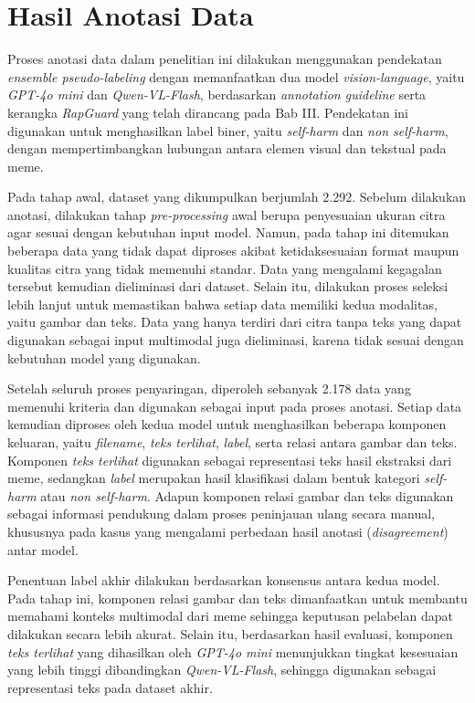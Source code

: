 \section{Hasil Anotasi Data} \label{IV.Anotasi}

Proses anotasi data dalam penelitian ini dilakukan menggunakan pendekatan \textit{ensemble pseudo-labeling} dengan memanfaatkan dua model \textit{vision-language}, yaitu \textit{GPT-4o mini} dan \textit{Qwen-VL-Flash}, berdasarkan \textit{annotation guideline} serta kerangka \textit{RapGuard} yang telah dirancang pada Bab III. Pendekatan ini digunakan untuk menghasilkan label biner, yaitu \textit{self-harm} dan \textit{non self-harm}, dengan mempertimbangkan hubungan antara elemen visual dan tekstual pada meme.

Pada tahap awal, dataset yang dikumpulkan berjumlah 2.292. Sebelum dilakukan anotasi, dilakukan tahap \textit{pre-processing} awal berupa penyesuaian ukuran citra  agar sesuai dengan kebutuhan input model. Namun, pada tahap ini ditemukan beberapa data yang tidak dapat diproses akibat ketidaksesuaian format maupun kualitas citra yang tidak memenuhi standar. Data yang mengalami kegagalan tersebut kemudian dieliminasi dari dataset. Selain itu, dilakukan proses seleksi lebih lanjut untuk memastikan bahwa setiap data memiliki kedua modalitas, yaitu gambar dan teks. Data yang hanya terdiri dari citra tanpa teks yang dapat digunakan sebagai input multimodal juga dieliminasi, karena tidak sesuai dengan kebutuhan model yang digunakan.

Setelah seluruh proses penyaringan, diperoleh sebanyak 2.178 data yang memenuhi kriteria dan digunakan sebagai input pada proses anotasi. Setiap data kemudian diproses oleh kedua model untuk menghasilkan beberapa komponen keluaran, yaitu \textit{filename}, \textit{teks terlihat}, \textit{label}, serta relasi antara gambar dan teks. Komponen \textit{teks terlihat} digunakan sebagai representasi teks hasil ekstraksi dari meme, sedangkan \textit{label} merupakan hasil klasifikasi dalam bentuk kategori \textit{self-harm} atau \textit{non self-harm}. Adapun komponen relasi gambar dan teks digunakan sebagai informasi pendukung dalam proses peninjauan ulang secara manual, khususnya pada kasus yang mengalami perbedaan hasil anotasi (\textit{disagreement}) antar model.

Penentuan label akhir dilakukan berdasarkan konsensus antara kedua model. Pada tahap ini, komponen relasi gambar dan teks dimanfaatkan untuk membantu memahami konteks multimodal dari meme sehingga keputusan pelabelan dapat dilakukan secara lebih akurat. Selain itu, berdasarkan hasil evaluasi, komponen \textit{teks terlihat} yang dihasilkan oleh \textit{GPT-4o mini} menunjukkan tingkat kesesuaian yang lebih tinggi dibandingkan \textit{Qwen-VL-Flash}, sehingga digunakan sebagai representasi teks pada dataset akhir.

